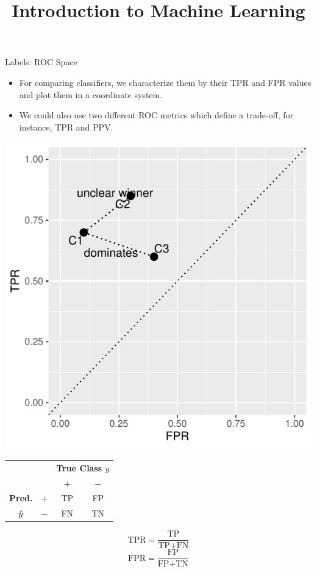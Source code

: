 \documentclass[11pt,compress,t,notes=noshow, xcolor=table]{beamer}
\title{Introduction to Machine Learning}
\institute{\href{https://compstat-lmu.github.io/lecture_i2ml/}{compstat-lmu.github.io/lecture\_i2ml}}
\date{}
\begin{document}
\sloppy


\begin{vbframe}{Labels: ROC Space}

\begin{itemize}
 \item For comparing classifiers, we characterize them by their TPR and FPR values and plot them in
 a coordinate system.
 \item We could also use two different ROC metrics which define a trade-off,
 for instance, TPR and PPV.
\end{itemize}

\lz

\begin{minipage}[c]{0.5\textwidth}
    \scriptsize
    {\centering \includegraphics[width=\textwidth]{figure/eval_mclass_roc_sp_1}}
\end{minipage}%
\begin{minipage}[c]{0.5\textwidth}
\begin{center}
  \small
  \begin{tabular}{cc|cc}
    & & \multicolumn{2}{c}{\bfseries True Class $y$} \\
    & & $+$ & $-$ \\
    \hline
    \bfseries Pred.     & $+$ & TP & FP \\
              $\hat{y}$ & $-$ & FN & TN \\
\end{tabular}
\lz
$$\text{TPR} = \frac{\text{TP}}{\text{TP} + \text{FN}}$$
$$\text{FPR} = \frac{\text{FP}}{\text{FP} + \text{TN}}$$
\end{center}
\end{minipage}


\end{vbframe}
\end{document}
